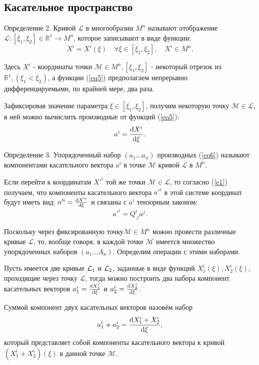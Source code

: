 \documentclass[14pt,a4paper]{extarticle}
\begin{document}
\subsection{Касательное пространство}
Определение 2. Кривой $\mathcal{L}$ в многообразии $M^n$ называют отображение $\mathcal{L}: [\xi_1,\xi_2] \in \mathbb{R}^1 \longrightarrow M^n$, которое записывают в виде функции:
\begin{equation}\label{eq5}
	X^i = X^i(\xi) \quad \forall \xi \in [\xi_1, \xi_2], \quad X^i \in M^n.	
\end{equation}

Здесь $X^i$ - координаты точки $\mathcal{M} \in M^n, [\xi_1, \xi_2]$ - некоторый отрезок из $\mathbb{R}^1, (\xi_1 < \xi_2)$, а функции (\ref{eq5}) предполагаем непрерывно дифференцируемыми, по крайней мере, два раза.


Зафиксировав значение параметра $\xi \in [\xi_1,\xi_2]$, получим некоторую точку $\mathcal{M} \in \mathcal{L}$, в ней можно вычислить производные от функций (\ref{eq5}):
\begin{equation}\label{eq6}
	a^i = \dv{X^i}{\xi}.
\end{equation}

Определение 3. Упорядоченный набор $(a_1\dots a_n)$ производных (\ref{eq6}) называют компонентами касательного вектора $a^i$ в точке $\mathcal{M}$ кривой $\mathcal{L}$ в $ M^n $.

Если перейти к координатам $X'^i$ той же точки $\mathcal{M} \in \mathcal{L}$, то согласно (\ref{e1}) получаем, что компоненты касательного вектора $a'^i$ в этой системе координат будут иметь вид: $a'^i = \dv{X'^i}{\xi}$ и связаны с $a^i$ тензорным законом:
\begin{equation}\label{eq7}
	a'^i = Q_{\; j}^i a^j.
\end{equation}

Поскольку через фиксированную точку$\mathcal{M} \in M^n$ можно провести различные кривые $\mathcal{L}$, то, вообще говоря, в каждой точке $\mathcal{M}$ имеется множество упорядоченных наборов $(a_1\dots A_n)$. Определим операции с этими наборами.

Пусть имеется две кривые $\mathcal{L_\textup{1}}$ и $\mathcal{L_\textup{2}}$, заданные в виде функций $X_1^i(\xi), X_2^i(\xi)$, проходящие через точку $\mathcal{L}$, тогда можно построить два набора компонент касательных векторов $a_1^i = \dv{X_1^i}{\xi}$ и $a_2^i = \dv{X_2^i}{\xi}$.

Суммой компонент двух касательных векторов назовём набор
\begin{equation}\label{eq8}
	a_1^i + a_2^i = \dv{X_1^i + X_2^i}{\xi},
\end{equation}
который представляет собой компоненты касательного вектора к кривой $(X_1^i + X_2^i)(\xi)$ в данной точке $\mathcal{M}$.
\end{document}
